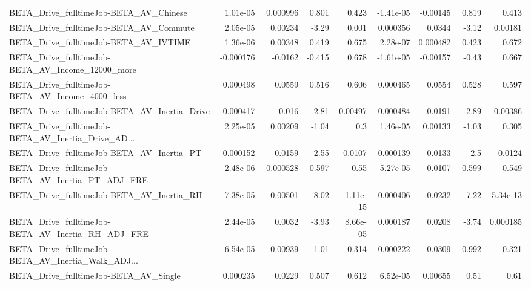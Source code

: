 \begin{tabular}{lrrrrrrrr}
BETA\_Drive\_fulltimeJob-BETA\_AV\_Chinese             &    1.01e-05 &     0.000996 &    0.801 &    0.423 &  -1.41e-05 &    -0.00145 &        0.819 &         0.413 \\
BETA\_Drive\_fulltimeJob-BETA\_AV\_Commute             &    2.05e-05 &      0.00234 &    -3.29 &    0.001 &   0.000356 &      0.0344 &        -3.12 &       0.00181 \\
BETA\_Drive\_fulltimeJob-BETA\_AV\_IVTIME              &    1.36e-06 &      0.00348 &    0.419 &    0.675 &   2.28e-07 &    0.000482 &        0.423 &         0.672 \\
BETA\_Drive\_fulltimeJob-BETA\_AV\_Income\_12000\_more   &   -0.000176 &      -0.0162 &   -0.415 &    0.678 &  -1.61e-05 &    -0.00157 &        -0.43 &         0.667 \\
BETA\_Drive\_fulltimeJob-BETA\_AV\_Income\_4000\_less    &    0.000498 &       0.0559 &    0.516 &    0.606 &   0.000465 &      0.0554 &        0.528 &         0.597 \\
BETA\_Drive\_fulltimeJob-BETA\_AV\_Inertia\_Drive       &   -0.000417 &       -0.016 &    -2.81 &  0.00497 &   0.000484 &      0.0191 &        -2.89 &       0.00386 \\
BETA\_Drive\_fulltimeJob-BETA\_AV\_Inertia\_Drive\_AD... &    2.25e-05 &      0.00209 &    -1.04 &      0.3 &   1.46e-05 &     0.00133 &        -1.03 &         0.305 \\
BETA\_Drive\_fulltimeJob-BETA\_AV\_Inertia\_PT          &   -0.000152 &      -0.0159 &    -2.55 &   0.0107 &   0.000139 &      0.0133 &         -2.5 &        0.0124 \\
BETA\_Drive\_fulltimeJob-BETA\_AV\_Inertia\_PT\_ADJ\_FRE  &   -2.48e-06 &    -0.000528 &   -0.597 &     0.55 &   5.27e-05 &      0.0107 &       -0.599 &         0.549 \\
BETA\_Drive\_fulltimeJob-BETA\_AV\_Inertia\_RH          &   -7.38e-05 &     -0.00501 &    -8.02 & 1.11e-15 &   0.000406 &      0.0232 &        -7.22 &      5.34e-13 \\
BETA\_Drive\_fulltimeJob-BETA\_AV\_Inertia\_RH\_ADJ\_FRE  &    2.44e-05 &       0.0032 &    -3.93 & 8.66e-05 &   0.000187 &      0.0208 &        -3.74 &      0.000185 \\
BETA\_Drive\_fulltimeJob-BETA\_AV\_Inertia\_Walk\_ADJ... &   -6.54e-05 &     -0.00939 &     1.01 &    0.314 &  -0.000222 &     -0.0309 &        0.992 &         0.321 \\
BETA\_Drive\_fulltimeJob-BETA\_AV\_Single              &    0.000235 &       0.0229 &    0.507 &    0.612 &   6.52e-05 &     0.00655 &         0.51 &          0.61 \\

\end{tabular}
